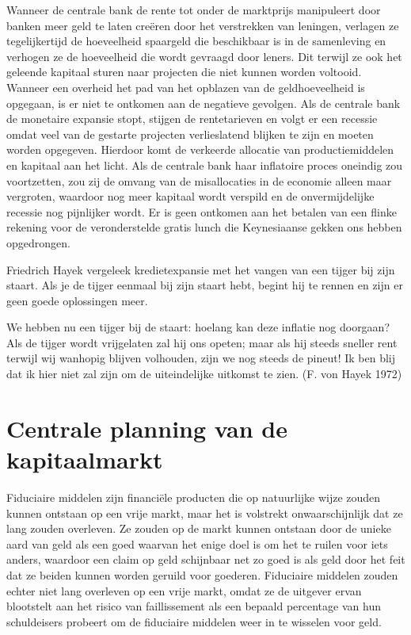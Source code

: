 \documentclass[
  a5paper,
  smalldemyvopaper,11pt,twoside,onecolumn,openright,extrafontsizes,
hidelinks]{memoir}
\begin{document}
Wanneer de centrale bank de rente tot onder de marktprijs manipuleert
door banken meer geld te laten creëren door het verstrekken van
leningen, verlagen ze tegelijkertijd de hoeveelheid spaargeld die
beschikbaar is in de samenleving en verhogen ze de hoeveelheid die wordt
gevraagd door leners. Dit terwijl ze ook het geleende kapitaal sturen
naar projecten die niet kunnen worden voltooid. Wanneer een overheid het
pad van het opblazen van de geldhoeveelheid is opgegaan, is er niet te
ontkomen aan de negatieve gevolgen. Als de centrale bank de monetaire
expansie stopt, stijgen de rentetarieven en volgt er een recessie omdat
veel van de gestarte projecten verlieslatend blijken te zijn en moeten
worden opgegeven. Hierdoor komt de verkeerde allocatie van
productiemiddelen en kapitaal aan het licht. Als de centrale bank haar
inflatoire proces oneindig zou voortzetten, zou zij de omvang van de
misallocaties in de economie alleen maar vergroten, waardoor nog meer
kapitaal wordt verspild en de onvermijdelijke recessie nog pijnlijker
wordt. Er is geen ontkomen aan het betalen van een flinke rekening voor
de veronderstelde gratis lunch die Keynesiaanse gekken ons hebben
opgedrongen.

Friedrich Hayek vergeleek kredietexpansie met het vangen van een tijger
bij zijn staart. Als je de tijger eenmaal bij zijn staart hebt, begint
hij te rennen en zijn er geen goede oplossingen meer.

We hebben nu een tijger bij de staart: hoelang kan deze inflatie nog
doorgaan? Als de tijger wordt vrijgelaten zal hij ons opeten; maar als
hij steeds sneller rent terwijl wij wanhopig blijven volhouden, zijn we
nog steeds de pineut! Ik ben blij dat ik hier niet zal zijn om de
uiteindelijke uitkomst te zien. (F. von Hayek 1972)

\section{Centrale planning van de
kapitaalmarkt}\label{centrale-planning-van-de-kapitaalmarkt}

Fiduciaire middelen zijn financiële producten die op natuurlijke wijze
zouden kunnen ontstaan op een vrije markt, maar het is volstrekt
onwaarschijnlijk dat ze lang zouden overleven. Ze zouden op de markt
kunnen ontstaan door de unieke aard van geld als een goed waarvan het
enige doel is om het te ruilen voor iets anders, waardoor een claim op
geld schijnbaar net zo goed is als geld door het feit dat ze beiden
kunnen worden geruild voor goederen. Fiduciaire middelen zouden echter
niet lang overleven op een vrije markt, omdat ze de uitgever ervan
blootstelt aan het risico van faillissement als een bepaald percentage
van hun schuldeisers probeert om de fiduciaire middelen weer in te
wisselen voor geld.
\end{document}
